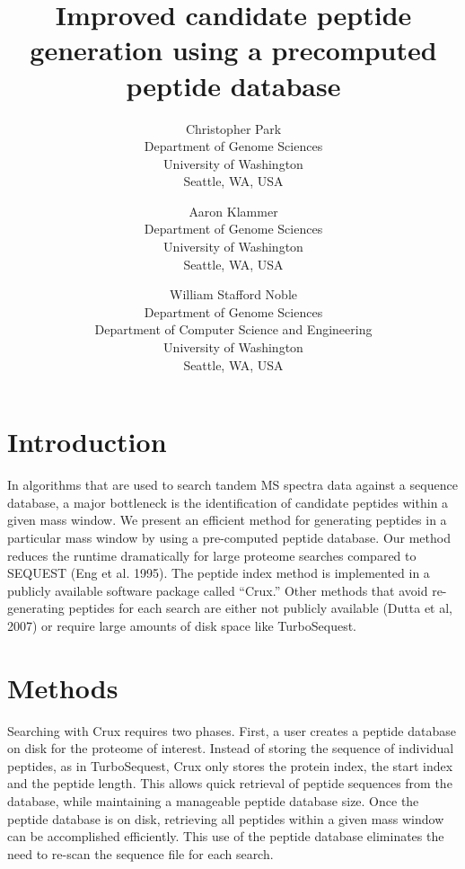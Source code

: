 \documentclass[12pt]{article}
\begin{document}
\title{Improved candidate peptide generation using a precomputed
peptide database}

\author{
Christopher Park\\
Department of Genome Sciences\\
University of Washington\\
Seattle, WA, USA
\and
Aaron Klammer\\
Department of Genome Sciences\\
University of Washington\\
Seattle, WA, USA
\and
William Stafford Noble\\
Department of Genome Sciences\\
Department of Computer Science and Engineering\\
University of Washington\\
Seattle, WA, USA
}

\maketitle

\section{Introduction}

In algorithms that are used to search tandem MS spectra data against a
sequence database, a major bottleneck is the identification of
candidate peptides within a given mass window. We present an efficient
method for generating peptides in a particular mass window by using a
pre-computed peptide database. Our method reduces the runtime
dramatically for large proteome searches compared to SEQUEST (Eng et
al. 1995).  The peptide index method is implemented in a publicly available software
package called ``Crux.''  Other methods that avoid re-generating
peptides for each search are either not publicly available (Dutta et
al, 2007) or require large amounts of disk space like TurboSequest.

\section{Methods}

Searching with Crux requires two phases.  First, a user creates a
peptide database on disk for the proteome of interest.  Instead of
storing the sequence of individual peptides, as in TurboSequest, 
Crux only stores the protein index, the start
index and the peptide length.  This allows quick retrieval of peptide
sequences from the database, while maintaining a manageable peptide
database size.  Once the peptide database is on disk, retrieving all
peptides within a given mass window can be accomplished efficiently.
This use of the peptide database eliminates the need to re-scan the
sequence file for each search.
\end{document}
